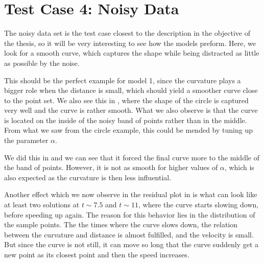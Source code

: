 \clearpage
\section{Test Case 4: Noisy Data}
The noisy data set is the test case closest to the description in the objective of the thesis, so it will be very interesting to see how the models preform. Here, we look for a smooth curve, which captures the shape while being distracted as little as possible by the noise. 

This should be the perfect example for model 1, since the curvature plays a bigger role when the distance is small, which should yield a smoother curve close to the point set. We also see this in , where the shape of the circle is captured very well and the curve is rather smooth. What we also observe is that the curve is located on the inside of the noisy band of points rather than in the middle. From what we saw from the circle example, this could be mended by tuning up the parameter $\alpha$.

We did this in  and we can see that it forced the final curve more to the middle of the band of points. However, it is not as smooth for higher values of $\alpha$, which is also expected as the curvature is then less influential.

Another effect which we now observe in the residual plot in  is what can look like at least two solutions at $t\sim 7.5$ and $t\sim 11$, where the curve starts slowing down, before speeding up again. The reason for this behavior lies in the distribution of the sample points. The the times where the curve slows down, the relation between the curvature and distance is almost fulfilled, and the velocity is small. But since the curve is not still, it can move so long that the curve suddenly get a new point as its closest point and then the speed increases. 

